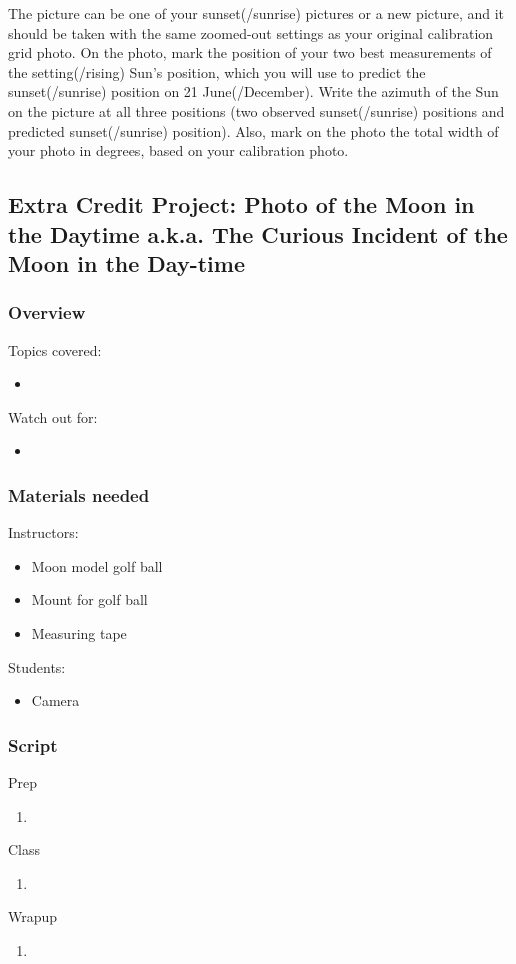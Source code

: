 \documentclass[12pt]{article}
\begin{document}
\begin{enumerate}
The picture can be one of your sunset(/sunrise) pictures or a new picture, and it should be taken with the same zoomed-out settings as your original calibration grid photo. On the photo, mark the position of your two best measurements of the setting(/rising) Sun's position, which you will use to predict the sunset(/sunrise) position on 21 June(/December). Write the azimuth of the Sun on the picture at all three positions (two observed sunset(/sunrise) positions and predicted sunset(/sunrise) position). Also, mark on the photo the total width of your photo in degrees, based on your calibration photo.
\end{enumerate}

\newpage
\subsection{Extra Credit Project: Photo of the Moon in the Daytime a.k.a. The Curious Incident of the Moon in the Day-time}
\subsubsection{Overview}
Topics covered:
\begin{itemize}
\item 
\end{itemize}
Watch out for:
\begin{itemize}
\item 
\end{itemize}

\subsubsection{Materials needed}
Instructors:
\begin{itemize}
  \item Moon model golf ball
  \item Mount for golf ball
  \item Measuring tape
\end{itemize}
Students:
\begin{itemize}
  \item Camera
\end{itemize}

\subsubsection{Script}
Prep
\begin{enumerate}
\item
\end{enumerate}
Class
\begin{enumerate}
\item
\end{enumerate}
Wrapup
\begin{enumerate}
\item
\end{enumerate}
\end{document}
